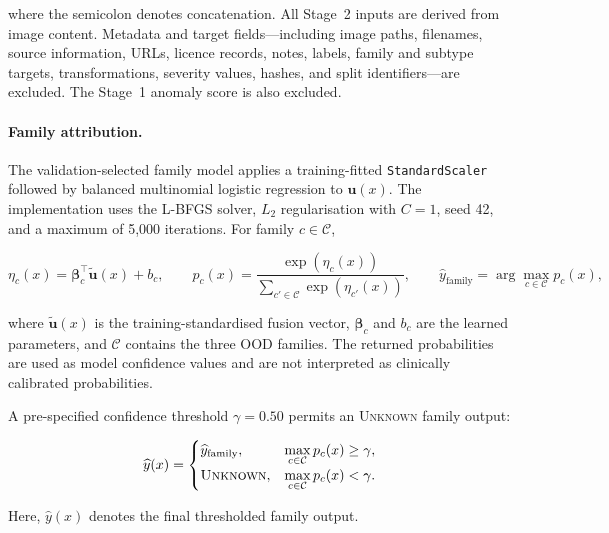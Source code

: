 \documentclass[fleqn,12pt]{olplainarticle}
\begin{document}
where the semicolon denotes concatenation. All Stage~2 inputs are derived from
image content. Metadata and target fields---including image paths, filenames,
source information, URLs, licence records, notes, labels, family and subtype
targets, transformations, severity values, hashes, and split identifiers---are
excluded. The Stage~1 anomaly score is also excluded.

\paragraph{Family attribution.}
The validation-selected family model applies a training-fitted
\texttt{StandardScaler} followed by balanced multinomial logistic regression
to $\mathbf{u}(x)$. The implementation uses the L-BFGS solver, $L_2$
regularisation with $C=1$, seed 42, and a maximum of 5,000 iterations. For
family $c\in\mathcal{C}$,

\begin{equation}
    \eta_c(x)
    =
    \boldsymbol{\beta}_c^{\top}
    \widetilde{\mathbf{u}}(x)
    +
    b_c,
    \qquad
    p_c(x)
    =
    \frac{\exp(\eta_c(x))}
         {\sum_{c'\in\mathcal{C}}\exp(\eta_{c'}(x))},
    \qquad
    \widehat{y}_{\mathrm{family}}
    =
    \arg\max_{c\in\mathcal{C}}
    p_c(x),
    \label{eq:method_stage2_family_logreg}
\end{equation}

where $\widetilde{\mathbf{u}}(x)$ is the training-standardised fusion vector,
$\boldsymbol{\beta}_c$ and $b_c$ are the learned parameters, and
$\mathcal{C}$ contains the three OOD families. The returned probabilities are
used as model confidence values and are not interpreted as clinically
calibrated probabilities.

A pre-specified confidence threshold $\gamma=0.50$ permits an
\textsc{Unknown} family output:

\begin{equation}
    \widehat{y}(x)
    =
    \begin{cases}
        \widehat{y}_{\mathrm{family}},
        &
        \displaystyle
        \max_{c\in\mathcal{C}} p_c(x)
        \geq \gamma,\\[3pt]
        \textsc{Unknown},
        &
        \displaystyle
        \max_{c\in\mathcal{C}} p_c(x)
        < \gamma.
    \end{cases}
    \label{eq:method_stage2_unknown}
\end{equation}

Here, $\widehat{y}(x)$ denotes the final thresholded family output.
\end{document}
